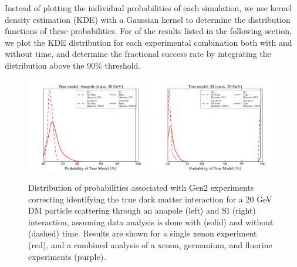 \documentclass[11pt]{article}
\begin{document}
Instead of plotting the individual probabilities of each simulation, we use kernel density estimation (KDE) with a Gaussian kernel to determine the distribution functions of these probabilities. For of the results listed in the following section, we plot the KDE distribution for each experimental combination both with and without time, and determine the fractional success rate by integrating the distribution above the 90\% threshold. 


\begin{figure}
\centering
\includegraphics[width=0.49\textwidth, trim=1.cm 0.0cm 1.cm 0.4cm,clip=true]{plots/PDF_Single_20GeV_Anapole_50sims_Xe_vs_FGeXe_GF_TNT.pdf}
\includegraphics[width=0.49\textwidth, trim=1.cm 0.0cm 1.cm 0.4cm,clip=true]{plots/PDF_Single_20GeV_SI_Higgs_50sims_Xe_vs_FGeXe_GF_TNT.pdf}
\caption{\label{fig:20gev_anapole_Xe_v_All_TNT_GF}
Distribution of probabilities associated with Gen2 experiments correcting identifying the true dark matter interaction for a $20$ GeV DM particle scattering through an anapole (left) and SI (right) interaction, assuming data analysis is done with (solid) and without (dashed) time. Results are shown for a single xenon experiment (red), and a combined analysis of a xenon, germanium, and fluorine experiments (purple).}
\end{figure}
\end{document}
